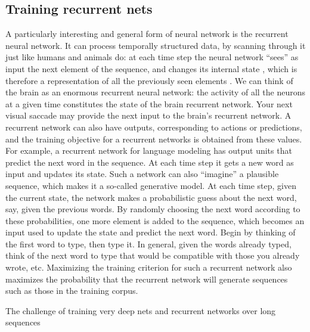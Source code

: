 \documentclass[11pt]{article} %
\begin{document}
\subsection{Training recurrent nets}

A particularly interesting and general form of neural network is the
recurrent neural network. It can process temporally structured data, by
scanning through it just like humans and animals do: at each time step the
neural network “sees” as input the next element of the sequence, and
changes its internal state , which is therefore a representation of all the
previously seen elements . We can think of the brain as an enormous
recurrent neural network: the activity of all the neurons at a given time
constitutes the state of the brain recurrent network. Your next visual
saccade may provide the next input to the brain’s recurrent network. A
recurrent network can also have outputs, corresponding to actions or
predictions, and the training objective for a recurrent networks is
obtained from these values. For example, a recurrent network for language
modeling has output units that predict the next word in the sequence. At
each time step it gets a new word as input and updates its state. Such a
network can also “imagine” a plausible sequence, which makes it a so-called
generative model.  At each time step, given the current state, the network
makes a probabilistic guess about the next word, say, given the previous
words. By randomly choosing the next word according to these probabilities,
one more element is added to the sequence, which becomes an input used to
update the state and predict the next word. Begin by thinking of the first
word to type, then type it. In general, given the words already typed,
think of the next word to type that would be compatible with those you
already wrote, etc. Maximizing the training criterion for such a recurrent
network also maximizes the probability that the recurrent network will
generate sequences such as those in the training corpus.


The challenge of training very deep nets and recurrent networks over long sequences
\end{document}
